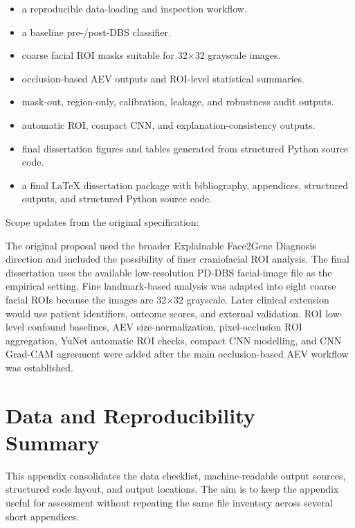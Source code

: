\begin{itemize}
\item a reproducible data-loading and inspection workflow.
\item a baseline pre-/post-DBS classifier.
\item coarse facial ROI masks suitable for 32$\times$32 grayscale images.
\item occlusion-based AEV outputs and ROI-level statistical summaries.
\item mask-out, region-only, calibration, leakage, and robustness audit outputs.
\item automatic ROI, compact CNN, and explanation-consistency outputs.
\item final dissertation figures and tables generated from structured Python source code.
\item a final LaTeX dissertation package with bibliography, appendices, structured outputs, and structured Python source code.
\end{itemize}

Scope updates from the original specification:


The original proposal used the broader Explainable Face2Gene Diagnosis direction and included the possibility of finer craniofacial ROI analysis. The final dissertation uses the available low-resolution PD-DBS facial-image file as the empirical setting. Fine landmark-based analysis was adapted into eight coarse facial ROIs because the images are 32$\times$32 grayscale. Later clinical extension would use patient identifiers, outcome scores, and external validation. ROI low-level confound baselines, AEV size-normalization, pixel-occlusion ROI aggregation, YuNet automatic ROI checks, compact CNN modelling, and CNN Grad-CAM agreement were added after the main occlusion-based AEV workflow was established.


\chapter{Data and Reproducibility Summary}

This appendix consolidates the data checklist, machine-readable output sources, structured code layout, and output locations. The aim is to keep the appendix useful for assessment without repeating the same file inventory across several short appendices.


